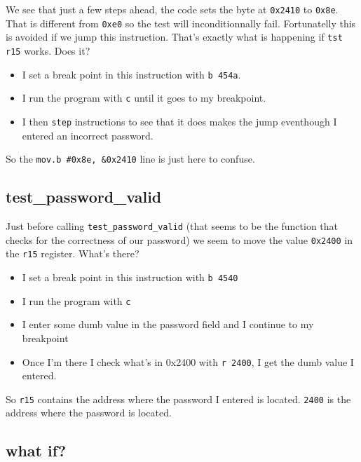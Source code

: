 \documentclass[a4paper,11pt]{article}
\begin{document}
We see that just a few steps ahead, the code sets the byte at
\texttt{0x2410} to \texttt{0x8e}. That is different from \texttt{0xe0}
so the test will inconditionnally fail. Fortunatelly this is avoided if
we jump this instruction. That's exactly what is happening if
\texttt{tst r15} works. Does it?

\begin{itemize}
\itemsep1pt\parskip0pt
\item
  I set a break point in this instruction with \texttt{b 454a}.
\item
  I run the program with \texttt{c} until it goes to my breakpoint.
\item
  I then \texttt{step} instructions to see that it does makes the jump
  eventhough I entered an incorrect password.
\end{itemize}

So the \texttt{mov.b \#0x8e, \&0x2410} line is just here to confuse.

\subsection{test\_password\_valid}\label{testux5fpasswordux5fvalid}

Just before calling \texttt{test\_password\_valid} (that seems to be the
function that checks for the correctness of our password) we seem to
move the value \texttt{0x2400} in the \texttt{r15} register. What's
there?

\begin{itemize}
\itemsep1pt\parskip0pt
\item
  I set a break point in this instruction with \texttt{b 4540}
\item
  I run the program with \texttt{c}
\item
  I enter some dumb value in the password field and I continue to my
  breakpoint
\item
  Once I'm there I check what's in 0x2400 with \texttt{r 2400}, I get
  the dumb value I entered.
\end{itemize}

So \texttt{r15} contains the address where the password I entered is
located. \texttt{2400} is the address where the password is located.

\subsection{what if?}\label{what-if}
\end{document}

